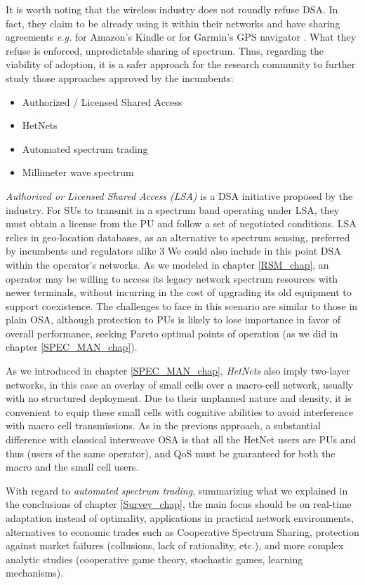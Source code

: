 It is worth noting that the wireless industry does not roundly refuse DSA. In fact, they claim to be already using it within their networks and have sharing agreements \textit{e.g.} for Amazon's Kindle or for Garmin's GPS navigator \cite{CTIA2011}. What they refuse is enforced, unpredictable sharing of spectrum. Thus, regarding the viability of adoption, it is a safer approach for the research community to further study those approaches approved by the incumbents:
\begin{itemize}
\item Authorized / Licensed Shared Access  
\item HetNets
\item Automated spectrum trading
\item Millimeter wave spectrum
\end{itemize}

\textit{Authorized or Licensed Shared Access (LSA)} is a DSA initiative proposed by the industry. For SUs to transmit in a spectrum band operating under LSA, they must obtain a license from the PU and follow a set of negotiated conditions. LSA relies in geo-location databases, as an alternative to spectrum sensing, preferred by incumbents and regulators alike 3 %
We could also include in this point DSA within the operator's networks. As we modeled in chapter \ref{RSM_chap}, an operator may be willing to access its legacy network spectrum resources with newer terminals, without incurring in the cost of upgrading its old equipment to support coexistence. The challenges to face in this scenario are similar to those in plain OSA, although protection to PUs is likely to lose importance in favor of overall performance, seeking Pareto optimal points of operation (as we did in chapter \ref{SPEC_MAN_chap}). 

As we introduced in chapter \ref{SPEC_MAN_chap}, \textit{HetNets} also imply two-layer networks, in this case an overlay of small cells over a macro-cell network, usually with no structured deployment. Due to their unplanned nature and density, it is convenient to equip these small cells with cognitive abilities to avoid interference with macro cell transmissions. As in the previous approach, a substantial difference with classical interweave OSA is that all the HetNet users are PUs and thus (users of the same operator), and QoS must be guaranteed for both the macro and the small cell users. 

With regard to \textit{automated spectrum trading}, summarizing what we explained in the conclusions of chapter \ref{Survey_chap}, the main focus should be on real-time adaptation instead of optimality, applications in practical network environments, alternatives to economic trades such as Cooperative Spectrum Sharing, protection against market failures (collusions, lack of rationality, etc.), and more complex analytic studies (cooperative game theory, stochastic games, learning mechanisms).

